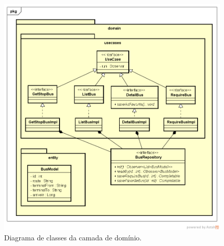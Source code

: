 \documentclass[
	12pt,				%
	oneside,			%
	a4paper,			%
	brazil				%
]{abntex2}
\begin{document}
\begin{apendicesenv}
\begin{figure}[H]
\centering
\includegraphics[width=15cm, center]{images/domain-layer}
\caption{Diagrama de classes da camada de domínio.}
\label{Rotulo}
\end{figure}


\end{apendicesenv}
\end{document}
